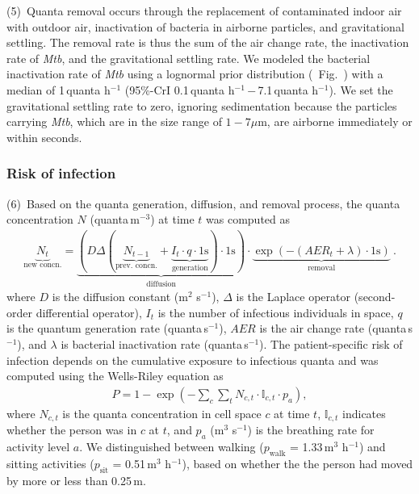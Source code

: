 \documentclass[fleqn,11pt]{wlscirep}
\begin{document}
(5)~Quanta removal occurs through the replacement of contaminated indoor air with outdoor air, inactivation of bacteria in airborne particles, and gravitational settling. The removal rate is thus the sum of the air change rate, the inactivation rate of \emph{Mtb}, and the gravitational settling rate. We modeled the bacterial inactivation rate of \emph{Mtb} using a lognormal prior distribution (\supp~Fig.~) with a median of 1\,quanta h$^{-1}$ (95\%-CrI 0.1\,quanta h$^{-1}$\,$-$\,7.1\,quanta h$^{-1}$)\cite{Loudon1969AMRRD,Lever2000LettersAppliedMicrobio,Gannon2007ResVetSci,Klein2014IJMyco}. We set the gravitational settling rate to zero, ignoring sedimentation because the particles carrying \emph{Mtb}, which are in the size range of $1-7\mu$m\cite{Fennelly2020Lancet}, are airborne immediately or within seconds\cite{Vuorinen2020SafSci}.

\subsubsection*{Risk of infection}

(6)~Based on the quanta generation, diffusion, and removal process, the quanta concentration $N$ (quanta\,m$^{-3}$) at time $t$ was computed as 
\begin{align}\label{eq:spattemp-N}
    \underbrace{N_{t}}_{\text{new concn.}} = \underbrace{\left(D \Delta (\underbrace{N_{t-1}}_{\text{prev. concn.}} + \underbrace{I_t \cdot q \cdot 1\text{s}}_{\text{generation}}) \cdot 1\text{s}\right)}_{\text{diffusion}} \cdot \underbrace{\exp\left(-(AER_t + \lambda) \cdot 1\text{s}\right)}_{\text{removal}} ~.
\end{align}
where $D$ is the diffusion constant (m$^2$ s$^{-1}$), $\Delta$ is the Laplace operator (second-order differential operator), $I_t$ is the number of infectious individuals in space, $q$ is the quantum generation rate (quanta\,s$^{-1}$), $AER$ is the air change rate (quanta\,s$^{-1}$), and $\lambda$ is bacterial inactivation rate (quanta\,s$^{-1}$). The patient-specific risk of infection depends on the cumulative exposure to infectious quanta and was computed using the Wells-Riley equation as
\begin{align}
    P = 1-\exp\left(-\sum_c \sum_t N_{c,t} \cdot \mathbb{I}_{c,t} \cdot p_a\right),
\end{align}
where $N_{c,t}$ is the quanta concentration in cell space $c$ at time $t$, $\mathbb{I}_{c,t}$ indicates whether the person was in $c$ at $t$, and $p_a$ (m$^3$ s$^{-1}$) is the breathing rate for activity level $a$. We distinguished between walking ($p_\mathrm{walk}$ = 1.33\,m$^3$ h$^{-1}$) and sitting activities ($p_\mathrm{sit}$ = 0.51\,m$^3$ h$^{-1}$)\cite{Adams1993}, based on whether the the person had moved by more or less than 0.25\,m.
\end{document}
